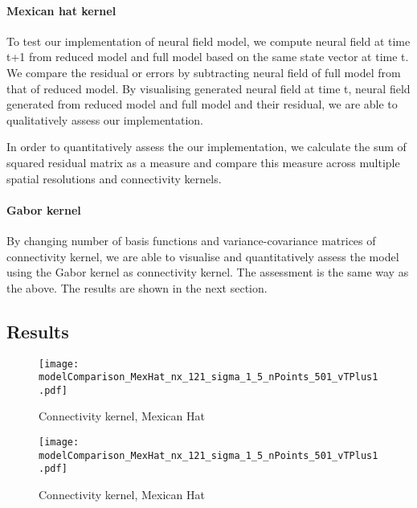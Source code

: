 \documentclass[a4paper, 12pt, english]{article}
\begin{document}
\paragraph{Mexican hat kernel\newline}
To test our implementation of neural field model, we compute neural field at time
t+1 from reduced model and full model based on the same state vector at time t.
We compare the residual or errors by subtracting neural field of full model
from that of reduced model. By visualising generated neural field at time t,
neural field generated from reduced model and full model and their residual,
we are able to qualitatively assess our implementation.\par
In order to quantitatively assess the our implementation, we calculate the sum of squared
residual matrix as a measure and compare this measure
across multiple spatial resolutions and connectivity kernels.


\paragraph{Gabor kernel\newline}
By changing number of basis functions and variance-covariance matrices of
connectivity kernel, we are able to visualise and quantitatively assess the model
using the Gabor kernel as connectivity kernel. The assessment is the same way as the above.
The results are shown in the next section.


\subsection{Results}

\begin{figure}[H]
\centering
\texttt{[image: modelComparison\_MexHat\_nx\_121\_sigma\_1\_5\_nPoints\_501\_vTPlus1.pdf]}
\caption{Connectivity kernel, Mexican Hat}
\end{figure}

\begin{figure}[H]
\centering
\texttt{[image: modelComparison\_MexHat\_nx\_121\_sigma\_1\_5\_nPoints\_501\_vTPlus1.pdf]}
\caption{Connectivity kernel, Mexican Hat}
\end{figure}
\end{document}
